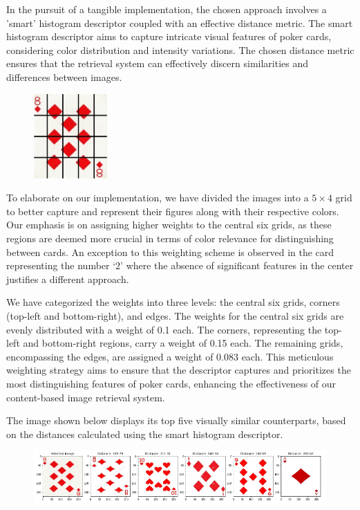 \documentclass[12pt]{article}
\begin{document}
In the pursuit of a tangible implementation, the chosen approach involves a 'smart' histogram descriptor coupled with an effective distance metric. The smart histogram descriptor aims to capture intricate visual features of poker cards, considering color distribution and intensity variations. The chosen distance metric ensures that the retrieval system can effectively discern similarities and differences between images.

\begin{figure}[H]
    \centering
    \includegraphics[width=0.25\textwidth]{imgs/sub_images.jpg}
\end{figure}

To elaborate on our implementation, we have divided the images into a $5 \times 4$ grid to better capture and represent their figures along with their respective colors. Our emphasis is on assigning higher weights to the central six grids, as these regions are deemed more crucial in terms of color relevance for distinguishing between cards. An exception to this weighting scheme is observed in the card representing the number `2' where the absence of significant features in the center justifies a different approach.

We have categorized the weights into three levels: the central six grids, corners (top-left and bottom-right), and edges. The weights for the central six grids are evenly distributed with a weight of 0.1 each. The corners, representing the top-left and bottom-right regions, carry a weight of 0.15 each. The remaining grids, encompassing the edges, are assigned a weight of 0.083 each. This meticulous weighting strategy aims to ensure that the descriptor captures and prioritizes the most distinguishing features of poker cards, enhancing the effectiveness of our content-based image retrieval system. 

The image shown below displays its top five visually similar counterparts, based on the distances calculated using the smart histogram descriptor.

\begin{figure}[H]
    \centering
    \includegraphics[width=\textwidth]{imgs/hist_order.png}
\end{figure}
\end{document}
